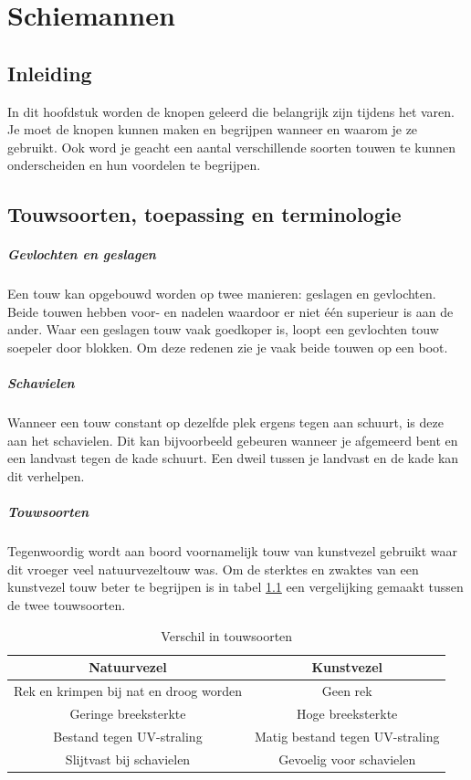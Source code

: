 \chapter{Schiemannen}
\section{Inleiding}
In dit hoofdstuk worden de knopen geleerd die belangrijk zijn tijdens het varen. Je moet de knopen kunnen maken en begrijpen wanneer en waarom je ze gebruikt. Ook word je geacht een aantal verschillende soorten touwen te kunnen onderscheiden en hun voordelen te begrijpen.

\section{Touwsoorten, toepassing en terminologie}

\paragraph{Gevlochten en geslagen}
Een touw kan opgebouwd worden op twee manieren: geslagen en gevlochten. Beide touwen hebben voor- en nadelen waardoor er niet één superieur is aan de ander. Waar een geslagen touw vaak goedkoper is, loopt een gevlochten touw soepeler door blokken. Om deze redenen zie je vaak beide touwen op een boot.

\paragraph{Schavielen}
Wanneer een touw constant op dezelfde plek ergens tegen aan schuurt, is deze aan het schavielen. Dit kan bijvoorbeeld gebeuren wanneer je afgemeerd bent en een landvast tegen de kade schuurt. Een dweil tussen je landvast en de kade kan dit verhelpen.

\paragraph{Touwsoorten}
Tegenwoordig wordt aan boord voornamelijk touw van kunstvezel gebruikt waar dit vroeger veel natuurvezeltouw was. Om de sterktes en zwaktes van een kunstvezel touw beter te begrijpen is in tabel \ref{table:touwwerk} een vergelijking gemaakt tussen de twee touwsoorten.

\begin{table}[h]
	\centering
	\caption{Verschil in touwsoorten}
	\label{table:touwwerk}
	\begin{tabular}{c|c}
		\textbf{Natuurvezel} & \textbf{Kunstvezel} \\ \hline
		Rek en krimpen bij nat en droog worden & Geen rek \\ \hline
		Geringe breeksterkte & Hoge breeksterkte \\ \hline
		Bestand tegen UV-straling & Matig bestand tegen UV-straling \\ \hline
		Slijtvast bij schavielen & Gevoelig voor schavielen
	\end{tabular}
\end{table}

